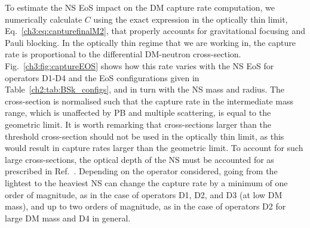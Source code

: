 



To estimate the NS EoS impact on the DM capture rate computation, we numerically calculate $C$ using the exact expression in the optically thin limit, Eq.~\ref{ch3:eq:capturefinalM2}, that properly accounts for gravitational focusing and Pauli blocking.  In the optically thin regime that we are working in, the capture rate is proportional to the differential DM-neutron cross-section. 
Fig.~\ref{ch3:fig:captureEOS} shows how this rate varies with the NS  EoS for operators D1-D4 and the EoS configurations given in Table~\ref{ch2:tab:BSk_configs}, and in turn with the NS mass and radius. 
The cross-section is normalised such that the capture rate in the intermediate mass range, which is unaffected by PB and multiple scattering, is equal to the geometric limit. It is worth remarking that cross-sections larger than the threshold cross-section should not be used in the optically thin limit, as this would result in capture rates larger than the geometric limit. To account for such large cross-sections, the optical depth of the NS must be accounted for as prescribed in Ref.~\cite{Bell:2020jou_sep_ImprovedTreatmentDark}.
Depending on the operator considered, going from the lightest to the heaviest NS can change the capture rate by a minimum of one order of magnitude, as in the case of operators D1, D2, and D3 (at low DM mass), and up to two orders of magnitude, as in the case of operators D2 for large DM mass and D4 in general. 

